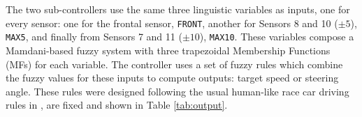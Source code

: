 \documentclass[10pt,journal,compsoc]{IEEEtran}
\begin{document}
The two sub-controllers use the same three linguistic variables as
inputs, one for every sensor: one for the frontal sensor,
\texttt{FRONT}, another for Sensors 8 and 10 ($\pm 5$\textdegree),
\texttt{MAX5}, and finally from Sensors 7 and 11 ($\pm
10$\textdegree), \texttt{MAX10}. These variables compose a Mamdani-based fuzzy
system \cite{iancu2012} with three trapezoidal Membership Functions
(MFs) for each variable. The controller uses a set of fuzzy rules
which combine the fuzzy values for these inputs to compute outputs:
target speed or steering angle.
These rules were designed following the usual human-like race car driving
rules in \cite{salem_evo18}, are fixed and shown in Table \ref{tab:output}.


\begin{table}[h!tb]
  \centering
  {\scriptsize
    \caption{{\scriptsize Rules  (from \cite{salem_evo18}) for speed (top) and steering
      (bottom) controller output. Additionally, when 
      the front, right and left sensors have the maximum value
      possible, a crisp rule that tries to set the max speed
      fires.  Angles will be reversed
      if the M10 is equal to Track 7 in the steering controller. The
      actual output will be the centroid of the output of all functions
      that are activated. \label{tab:output}}}
}
\end{table}
\end{document}
